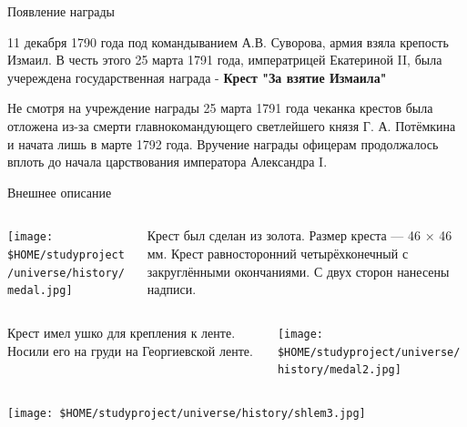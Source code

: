 \begin{frame}{Появление награды}

	11 декабря 1790 года под командыванием А.В. Суворова, армия взяла крепость Измаил. В честь этого 25 марта 1791 года, императрицей Екатериной II, была учереждена государственная награда - \textbf{Крест "За взятие Измаила"}

\end{frame}
\begin{frame}{}
	Не смотря на учреждение награды 25 марта 1791 года чеканка крестов была отложена из-за смерти главнокомандующего светлейшего князя Г. А. Потёмкина и начата лишь в марте 1792 года. Вручение награды офицерам продолжалось вплоть до начала царствования императора Александра I.
\end{frame}
\begin{frame}{Внешнее описание}
	\begin{columns}
		\begin{column}{0.45\textwidth}
			\texttt{[image: \$HOME/studyproject/universe/history/medal.jpg]}
		\end{column}
		\begin{column}{0.45\textwidth}

			Крест был сделан из золота. Размер креста — 46 × 46 мм. Крест равносторонний четырёхконечный с закруглёнными окончаниями. С двух сторон нанесены надписи.

		\end{column}
	\end{columns}
\end{frame}
\begin{frame}{}
	\begin{columns}
		\begin{column}{0.45\textwidth}

			Крест имел ушко для крепления к ленте. Носили его на груди на Георгиевской ленте.

		\end{column}
		\begin{column}{0.45\textwidth}

			\texttt{[image: \$HOME/studyproject/universe/history/medal2.jpg]}

		\end{column}
	\end{columns}
\end{frame}
\begin{frame}{}
	\begin{columns}
		\begin{column}{0.45\textwidth}
			\texttt{[image: \$HOME/studyproject/universe/history/shlem3.jpg]}
		\end{column}
		\begin{column}{0.45\textwidth}

		\end{column}
	\end{columns}
\end{frame}


